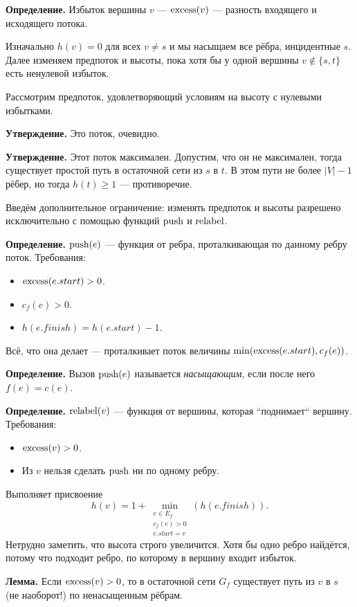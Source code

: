 \textbf{Определение.} Избыток вершины $v$ --- $\operatorname{excess}(v)$ --- разность входящего и исходящего потока.

Изначально $h(v) = 0$ для всех $v \ne s$ и мы насыщаем все рёбра, инцидентные $s$.
Далее изменяем предпоток и высоты, пока хотя бы у одной вершины $v \not\in \{s, t\}$ есть ненулевой избыток.

Рассмотрим предпоток, удовлетворяющий условиям на высоту с нулевыми избытками.

\textbf{Утверждение.} Это поток, очевидно.

\textbf{Утверждение.} Этот поток максимален. Допустим, что он не максимален, тогда существует простой путь в остаточной сети из $s$ в $t$.
В этом пути не более $|V| - 1$ рёбер, но тогда $h(t) \ge 1$ --- противоречие.

Введём дополнительное ограничение: изменять предпоток и высоты разрешено исключительно с помощью функций $\operatorname{push}$ и $\operatorname{relabel}$.

\textbf{Определение.} $\operatorname{push}(e)$ --- функция от ребра, проталкивающая по данному ребру поток. Требования:
\begin{itemize}
    \item $\operatorname{excess}(e.start) > 0$.
    \item $c_f(e) > 0$.
    \item $h(e.finish) = h(e.start) - 1$.
\end{itemize}
Всё, что она делает --- проталкивает поток величины $\min(\operatorname{excess}(e.start), c_f(e))$.

\textbf{Определение.} Вызов $\operatorname{push}(e)$ называется \textit{насыщающим}, если после него $f(e) = c(e)$.

\textbf{Определение.} $\operatorname{relabel}(v)$ --- функция от вершины, которая ``поднимает`` вершину. Требования:
\begin{itemize}
    \item $\operatorname{excess}(v) > 0$.
    \item Из $v$ нельзя сделать $\operatorname{push}$ ни по одному ребру.
\end{itemize}
Выполняет присвоение 
\[
    h(v) = 1 + \min_{\substack{e \in E_f \\ c_f(e) > 0 \\ e.start = v}}(h(e.finish)).
\]
Нетрудно заметить, что высота строго увеличится.
Хотя бы одно ребро найдётся, потому что подходит ребро, по которому в вершину входит избыток.

\textbf{Лемма.} Если $\operatorname{excess}(v) > 0$, то в остаточной сети $G_f$ существует путь из $v$ в $s$ (не наоборот!) по ненасыщенным рёбрам.

